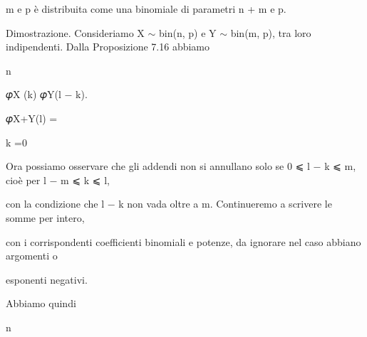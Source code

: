 \documentclass[a4paper,portrait,12pt]{article}
\begin{document}
\begin{flushleft}
m e p \`{e} distribuita come una binomiale di parametri n + m e p.
\end{flushleft}


\begin{flushleft}
Dimostrazione. Consideriamo X $\sim$ bin(n, p) e Y $\sim$ bin(m, p), tra loro indipendenti. Dalla Proposizione 7.16 abbiamo
\end{flushleft}


\begin{flushleft}
n
\end{flushleft}





\begin{flushleft}
𝜑X (k) 𝜑Y(l $-$ k).
\end{flushleft}





\begin{flushleft}
𝜑X+Y(l) =
\end{flushleft}


\begin{flushleft}
k =0
\end{flushleft}





\begin{flushleft}
Ora possiamo osservare che gli addendi non si annullano solo se 0 ⩽ l $-$ k ⩽ m, cio\`{e} per l $-$ m ⩽ k ⩽ l,
\end{flushleft}


\begin{flushleft}
con la condizione che l $-$ k non vada oltre a m. Continueremo a scrivere le somme per intero,
\end{flushleft}


\begin{flushleft}
con i corrispondenti coefficienti binomiali e potenze, da ignorare nel caso abbiano argomenti o
\end{flushleft}


\begin{flushleft}
esponenti negativi.
\end{flushleft}


\begin{flushleft}
Abbiamo quindi
\end{flushleft}


\begin{flushleft}
n
\end{flushleft}
\end{document}

